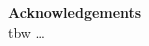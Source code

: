 \thispagestyle{empty}
\begin{titlepage}
{\bf\Large Acknowledgements}\\

tbw \ldots

\vfill
\end{titlepage}
